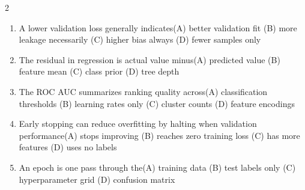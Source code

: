 \documentclass[a4paper]{article}
\begin{document}
\begin{multicols*}{2}
\begin{enumerate}[resume]
\item A lower validation loss generally indicates\newline\hspace*{0.6em}(A) better validation fit \quad (B) more leakage necessarily \newline\hspace*{0.6em}(C) higher bias always \quad (D) fewer samples only
\item The residual in regression is actual value minus\newline\hspace*{0.6em}(A) predicted value \quad (B) feature mean \newline\hspace*{0.6em}(C) class prior \quad (D) tree depth
\item The ROC AUC summarizes ranking quality across\newline\hspace*{0.6em}(A) classification thresholds \quad (B) learning rates only \newline\hspace*{0.6em}(C) cluster counts \quad (D) feature encodings
\item Early stopping can reduce overfitting by halting when validation performance\newline\hspace*{0.6em}(A) stops improving \quad (B) reaches zero training loss \newline\hspace*{0.6em}(C) has more features \quad (D) uses no labels
\item An epoch is one pass through the\newline\hspace*{0.6em}(A) training data \quad (B) test labels only \newline\hspace*{0.6em}(C) hyperparameter grid \quad (D) confusion matrix
\end{enumerate}
\end{multicols*}
\end{document}
